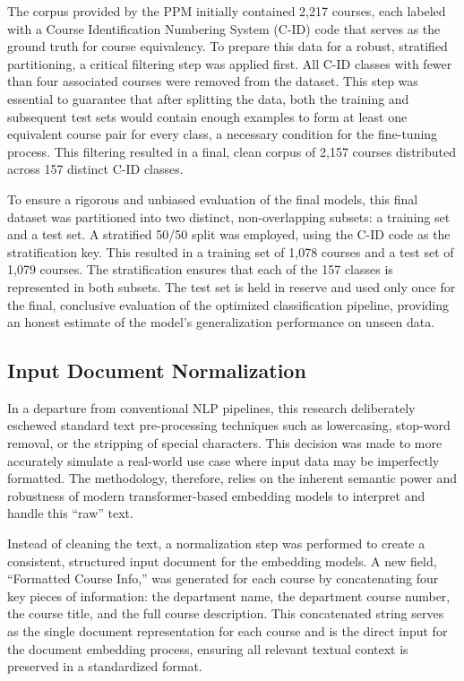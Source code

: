 The corpus provided by the PPM initially contained 2,217 courses, each labeled with a Course Identification Numbering System (C-ID) code that serves as the ground truth for course equivalency. To prepare this data for a robust, stratified partitioning, a critical filtering step was applied first. All C-ID classes with fewer than four associated courses were removed from the dataset. This step was essential to guarantee that after splitting the data, both the training and subsequent test sets would contain enough examples to form at least one equivalent course pair for every class, a necessary condition for the fine-tuning process. This filtering resulted in a final, clean corpus of 2,157 courses distributed across 157 distinct C-ID classes.

To ensure a rigorous and unbiased evaluation of the final models, this final dataset was partitioned into two distinct, non-overlapping subsets: a training set and a test set. A stratified 50/50 split was employed, using the C-ID code as the stratification key. This resulted in a training set of 1,078 courses and a test set of 1,079 courses. The stratification ensures that each of the 157 classes is represented in both subsets. The test set is held in reserve and used only once for the final, conclusive evaluation of the optimized classification pipeline, providing an honest estimate of the model's generalization performance on unseen data.

\subsection{Input Document Normalization}\label{ch:3.2.2}
In a departure from conventional NLP pipelines, this research deliberately eschewed standard text pre-processing techniques such as lowercasing, stop-word removal, or the stripping of special characters. This decision was made to more accurately simulate a real-world use case where input data may be imperfectly formatted. The methodology, therefore, relies on the inherent semantic power and robustness of modern transformer-based embedding models to interpret and handle this ``raw'' text.

Instead of cleaning the text, a normalization step was performed to create a consistent, structured input document for the embedding models. A new field, ``Formatted Course Info,'' was generated for each course by concatenating four key pieces of information: the department name, the department course number, the course title, and the full course description. This concatenated string serves as the single document representation for each course and is the direct input for the document embedding process, ensuring all relevant textual context is preserved in a standardized format.

